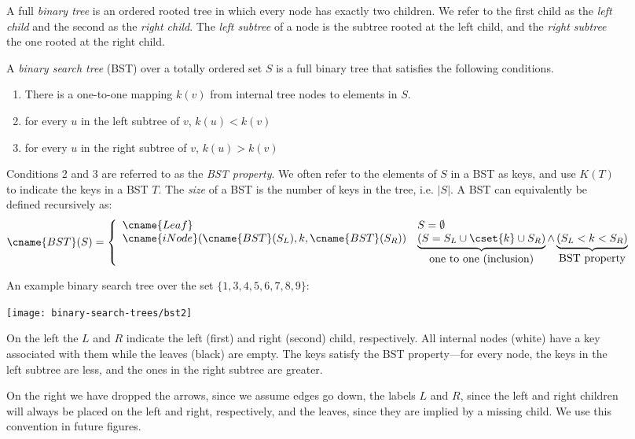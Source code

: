 \begin{figure}
\begin{definition}
\label{def:binarytree}
A full \emph{binary tree} is an ordered rooted tree in which every node has
exactly two children.  We refer to the first child as the \emph{left
  child} and the second as the \emph{right child}.  The \emph{left
  subtree} of a node is the subtree rooted at the left child, and the
\emph{right subtree} the one rooted at the right child.
\end{definition}

\begin{definition}
\label{def:bst}
A \emph{binary search tree} (BST) over a totally ordered set $S$ is a
full binary tree that satisfies the following conditions.
\begin{enumerate}
 \item There is a one-to-one mapping $k(v)$ from internal tree nodes to elements in $S$.
 \item for every $u$ in the left subtree of $v$, $k(u) < k(v)$
 \item for every $u$ in the right subtree of $v$, $k(u) > k(v)$
\end{enumerate}
Conditions 2 and 3 are referred to as the \emph{BST property}.  We
often refer to the elements of $S$ in a BST as keys, and use $K(T)$ to
indicate the keys in a BST $T$.  The \emph{size} of a
BST is the number of keys in the tree, i.e. $|S|$.  A BST can
equivalently be defined recursively as:
\[
\cname{BST}(S) = \left\{\begin{array}{ll}
\cname{Leaf} & S = \emptyset\\
\cname{iNode}(\cname{BST}(S_L), k, \cname{BST}(S_R)) & 
\underbrace{(S = S_L \cup \cset{k} \cup S_R)}_{\mbox{one to one (inclusion)}} \wedge \underbrace{(S_L < k < S_R)}_{\mbox{BST property}}
\end{array}\right.
\]
\end{definition}

\begin{example}
\label{ex:bst}
An example binary search tree over the set $\{1,3,4,5,6,7,8,9\}$:
\begin{center}
  \texttt{[image: binary-search-trees/bst2]}~~~~~~~
\end{center}
On the left the $L$ and $R$ indicate the left (first) and right
(second) child, respectively.  All internal nodes (white) have a key
associated with them while the leaves (black) are empty.  The keys
satisfy the BST property---for every node, the keys in the left
subtree are less, and the ones in the right subtree are greater.

\vspace{.05in}

On the right we have dropped the arrows, since we assume edges go
down, the labels $L$ and $R$, since the left and right children will
always be placed on the left and right, respectively, and the leaves,
since they are implied by a missing child.  We use this
convention in future figures.
\end{example}
\end{figure}


